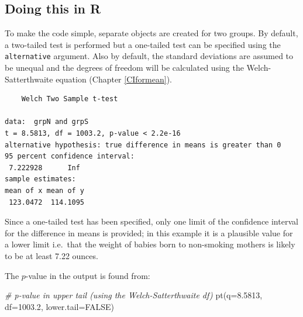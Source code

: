 \documentclass[
  oneside]{krantz}
\newenvironment{Shaded}{\begin{snugshade}}{\end{snugshade}}
\newcommand{\AttributeTok}[1]{\textcolor[rgb]{0.77,0.63,0.00}{#1}}
\newcommand{\CommentTok}[1]{\textcolor[rgb]{0.56,0.35,0.01}{\textit{#1}}}
\newcommand{\ConstantTok}[1]{\textcolor[rgb]{0.00,0.00,0.00}{#1}}
\newcommand{\DecValTok}[1]{\textcolor[rgb]{0.00,0.00,0.81}{#1}}
\newcommand{\FloatTok}[1]{\textcolor[rgb]{0.00,0.00,0.81}{#1}}
\newcommand{\FunctionTok}[1]{\textcolor[rgb]{0.00,0.00,0.00}{#1}}
\newcommand{\NormalTok}[1]{#1}
\newcommand{\OtherTok}[1]{\textcolor[rgb]{0.56,0.35,0.01}{#1}}
\newcommand{\SpecialCharTok}[1]{\textcolor[rgb]{0.00,0.00,0.00}{#1}}
\newcommand{\StringTok}[1]{\textcolor[rgb]{0.31,0.60,0.02}{#1}}
\begin{document}
\hypertarget{doing-this-in-r-13}{%
\subsection{Doing this in R}\label{doing-this-in-r-13}}

To make the code simple, separate objects are created for two groups. By default, a two-tailed test is performed but a one-tailed test can be specified using the \texttt{alternative} argument. Also by default, the standard deviations are assumed to be unequal and the degrees of freedom will be calculated using the Welch-Satterthwaite equation (Chapter \ref{CIformean}).

\begin{Shaded}
\end{Shaded}

\begin{verbatim}
    Welch Two Sample t-test

data:  grpN and grpS
t = 8.5813, df = 1003.2, p-value < 2.2e-16
alternative hypothesis: true difference in means is greater than 0
95 percent confidence interval:
 7.222928      Inf
sample estimates:
mean of x mean of y 
 123.0472  114.1095 
\end{verbatim}

Since a one-tailed test has been specified, only one limit of the confidence interval for the difference in means is provided; in this example it is a plausible value for a lower limit i.e.~that the weight of babies born to non-smoking mothers is likely to be at least 7.22 ounces.

The \(p\)-value in the output is found from:

\begin{Shaded}
\begin{Highlighting}[]
\CommentTok{\# p{-}value in upper tail (using the Welch{-}Satterthwaite df)}
\FunctionTok{pt}\NormalTok{(}\AttributeTok{q=}\FloatTok{8.5813}\NormalTok{, }\AttributeTok{df=}\FloatTok{1003.2}\NormalTok{, }\AttributeTok{lower.tail=}\ConstantTok{FALSE}\NormalTok{)}
\end{Highlighting}
\end{Shaded}
\end{document}

